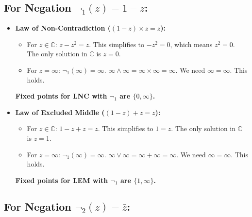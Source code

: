 \documentclass{article}
\begin{document}
	\subsection{For Negation $\neg_1(z) = 1 - z$:}
	
	\begin{itemize}
		\item \textbf{Law of Non-Contradiction ($(1 - z) \times z = z$):}
		\begin{itemize}
			\item For $z \in \mathbb{C}$: $z - z^2 = z$. This simplifies to $-z^2 = 0$, which means $z^2 = 0$. The only solution in $\mathbb{C}$ is $z = 0$.
			\item For $z = \infty$: $\neg_1(\infty) = \infty$. $\infty \wedge \infty = \infty \times \infty = \infty$. We need $\infty = \infty$. This holds.
		\end{itemize}
		\textbf{Fixed points for LNC with $\neg_1$ are $\{0, \infty\}$.}
		
		\item \textbf{Law of Excluded Middle ($(1 - z) + z = z$):}
		\begin{itemize}
			\item For $z \in \mathbb{C}$: $1 - z + z = z$. This simplifies to $1 = z$. The only solution in $\mathbb{C}$ is $z = 1$.
			\item For $z = \infty$: $\neg_1(\infty) = \infty$. $\infty \vee \infty = \infty + \infty = \infty$. We need $\infty = \infty$. This holds.
		\end{itemize}
		\textbf{Fixed points for LEM with $\neg_1$ are $\{1, \infty\}$.}
	\end{itemize}
	
	\subsection{For Negation $\neg_2(z) = \bar{z}$:}
	
\end{document}

